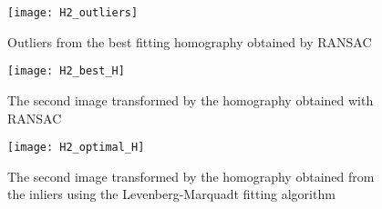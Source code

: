 \begin{figure}[H]
  \centering
  \texttt{[image: H2\_outliers]}
  \caption{Outliers from the best fitting homography obtained by RANSAC}
\end{figure}

\begin{figure}[H]
  \centering
  \texttt{[image: H2\_best\_H]}
  \caption{The second image transformed by the homography obtained with RANSAC}
\end{figure}

\begin{figure}[H]
  \centering
  \texttt{[image: H2\_optimal\_H]}
  \caption{The second image transformed by the homography obtained from the
  inliers using the Levenberg-Marquadt fitting algorithm}
\end{figure}

